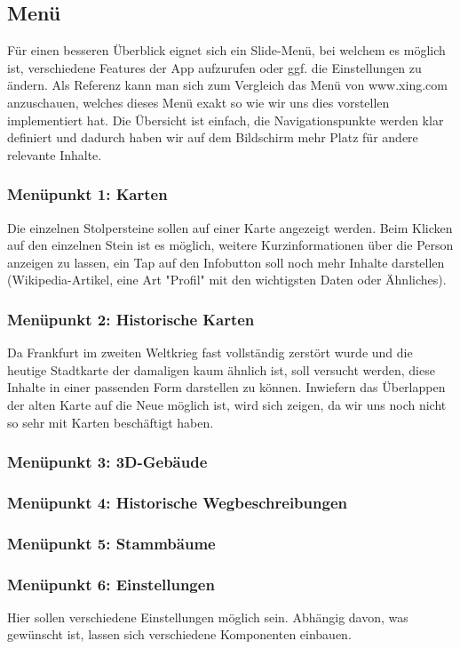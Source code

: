 \documentclass[a4paper, 11pt]{report}
\begin{document}
	\subsection*{Menü}
	
	Für einen besseren Überblick eignet sich ein Slide-Menü, bei welchem es möglich ist, verschiedene Features der App aufzurufen oder ggf. die Einstellungen zu ändern. Als Referenz kann man sich zum Vergleich das Menü von www.xing.com anzuschauen, welches dieses Menü exakt so wie wir uns dies vorstellen implementiert hat. Die Übersicht ist einfach, die Navigationspunkte werden klar definiert und dadurch haben wir auf dem Bildschirm mehr Platz für andere relevante Inhalte.
	
	\subsubsection*{Menüpunkt 1: Karten}
	
	Die einzelnen Stolpersteine sollen auf einer Karte angezeigt werden. Beim Klicken auf den einzelnen Stein ist es möglich, weitere Kurzinformationen über die Person anzeigen zu lassen, ein Tap auf den Infobutton soll noch mehr Inhalte darstellen (Wikipedia-Artikel, eine Art "Profil" mit den wichtigsten Daten oder Ähnliches).\newpage
	
	\subsubsection{Menüpunkt 2: Historische Karten}
	
	Da Frankfurt im zweiten Weltkrieg fast vollständig zerstört wurde und die heutige Stadtkarte der damaligen kaum ähnlich ist, soll versucht werden, diese Inhalte in einer passenden Form darstellen zu können. Inwiefern das Überlappen der alten Karte auf die Neue möglich ist, wird sich zeigen, da wir uns noch nicht so sehr mit Karten beschäftigt haben. 
	
	\subsubsection{Menüpunkt 3:  3D-Gebäude}
	
	
	
	\subsubsection{Menüpunkt 4: Historische Wegbeschreibungen}
	
	\subsubsection{Menüpunkt 5: Stammbäume}
	
	\subsubsection{Menüpunkt 6: Einstellungen}
	
	Hier sollen verschiedene Einstellungen möglich sein. Abhängig davon, was gewünscht ist, lassen sich verschiedene Komponenten einbauen.
	
	
	
\end{document}
